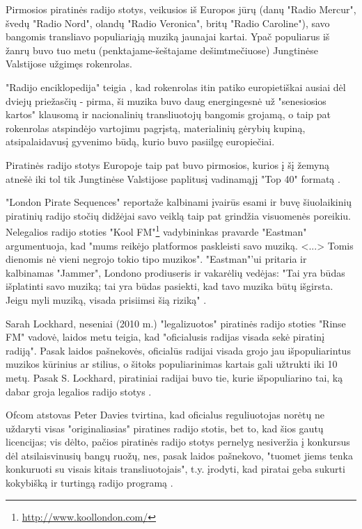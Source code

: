 \documentclass[kursinis-darbas]{vukf}
\begin{document}
Pirmosios piratinės radijo stotys, veikusios iš Europos jūrų (danų "Radio Mercur", švedų "Radio Nord", olandų "Radio Veronica", britų "Radio Caroline"), savo bangomis transliavo populiariąją muziką jaunajai kartai. Ypač populiarus iš žanrų buvo tuo metu (penktajame-šeštajame dešimtmečiuose) Jungtinėse Valstijose užgimęs rokenrolas.

"Radijo enciklopedija" teigia \cite[p.~237]{chs_encyclopedia_of_radio}, kad rokenrolas itin patiko europietiškai ausiai dėl dviejų priežasčių - pirma, ši muzika buvo daug energingesnė už "senesiosios kartos" klausomą ir nacionalinių transliuotojų bangomis grojamą, o taip pat rokenrolas atspindėjo vartojimu pagrįstą, materialinių gėrybių kupiną, atsipalaidavusį gyvenimo būdą, kurio buvo pasiilgę europiečiai.

Piratinės radijo stotys Europoje taip pat buvo pirmosios, kurios į šį žemyną atnešė iki tol tik Jungtinėse Valstijose paplitusį vadinamąjį "Top 40" formatą \cite[p.~237]{chs_encyclopedia_of_radio}.

"London Pirate Sequences" reportaže kalbinami įvairūs esami ir buvę šiuolaikinių piratinių radijo stočių didžėjai savo veiklą taip pat grindžia visuomenės poreikiu. Nelegalios radijo stoties "Kool FM"\footnote{\url{http://www.koollondon.com/}} vadybininkas pravarde "Eastman" argumentuoja, kad "mums reikėjo platformos paskleisti savo muziką. <...> Tomis dienomis nė vieni negrojo tokio tipo muzikos". "Eastman"'ui pritaria ir kalbinamas "Jammer", Londono prodiuseris ir vakarėlių vedėjas: "Tai yra būdas išplatinti savo muziką; tai yra būdas pasiekti, kad tavo muzika būtų išgirsta. Jeigu myli muziką, visada prisiimsi šią riziką" \cite{vice_london_pirate_sequences}.

Sarah Lockhard, neseniai (2010 m.) "legalizuotos" piratinės radijo stoties "Rinse FM" vadovė, laidos metu teigia, kad "oficialusis radijas visada sekė piratinį radiją". Pasak laidos pašnekovės, oficialūs radijai visada grojo jau išpopuliarintus muzikos kūrinius ar stilius, o šitoks populiarinimas kartais gali užtrukti iki 10 metų. Pasak S. Lockhard, piratiniai radijai buvo tie, kurie išpopuliarino tai, ką dabar groja legalios radijo stotys \cite{bbc_radio_4_do_pirates_rule_the_air_waves}.

\gls{Ofcom} atstovas Peter Davies tvirtina, kad oficialus reguliuotojas norėtų ne uždaryti visas "originaliasias" piratines radijo stotis, bet to, kad šios gautų licencijas; vis dėlto, pačios piratinės radijo stotys pernelyg nesiveržia į konkursus dėl atsilaisvinusių bangų ruožų, nes, pasak laidos pašnekovo, "tuomet jiems tenka konkuruoti su visais kitais transliuotojais", t.y. įrodyti, kad piratai geba sukurti kokybišką ir turtingą radijo programą \cite{bbc_radio_4_do_pirates_rule_the_air_waves}.
\end{document}
